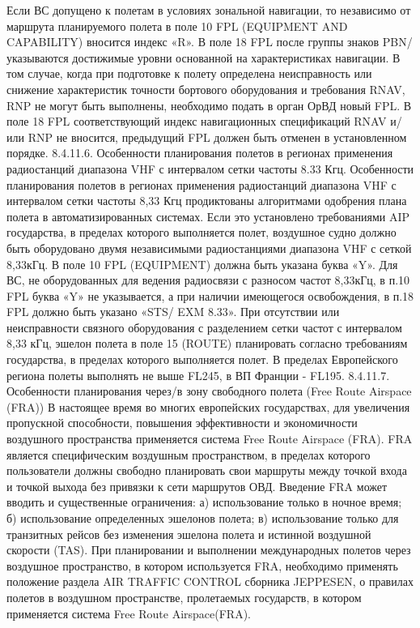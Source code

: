 Если ВС допущено к полетам в условиях зональной навигации, то независимо от маршрута планируемого полета в поле 10 FPL (EQUIPMENT AND CAPABILITY) вносится индекс «R». В поле 18 FPL после группы знаков PBN/ указываются достижимые уровни основанной на характеристиках навигации.
В том случае, когда при подготовке к полету определена неисправность или снижение характеристик точности бортового оборудования и требования RNAV, RNP не могут быть выполнены, необходимо подать в орган ОрВД новый FPL. В поле 18 FPL соответствующий индекс навигационных спецификаций RNAV и/или RNP не вносится, предыдущий FPL должен быть отменен в установленном порядке.
8.4.11.6. Особенности планирования полетов в регионах применения радиостанций диапазона VHF с интервалом сетки частоты 8.33 Кгц.
Особенности планирования полетов в регионах применения радиостанций диапазона VHF с интервалом 
сетки частоты 8,33 Кгц продиктованы алгоритмами одобрения плана полета в автоматизированных системах. 
Если это установлено требованиями AIP государства, в пределах которого выполняется полет, воздушное судно должно быть оборудовано двумя независимыми радиостанциями диапазона VHF с сеткой 8,33кГц. В поле 10 FPL (EQUIPMENT) должна быть указана буква «Y». 
Для ВС, не оборудованных для ведения радиосвязи с разносом частот 8,33кГц, в п.10 FPL буква «Y» не указывается, а при наличии имеющегося освобождения, в п.18 FPL должно быть указано «STS/ EXM 8.33». 
При отсутствии или неисправности связного оборудования с разделением сетки частот с интервалом 8,33 кГц, эшелон полета в поле 15 (ROUTE) планировать согласно требованиям государства, в пределах которого выполняется полет. В пределах Европейского региона полеты выполнять не выше FL245, в ВП Франции - FL195.
8.4.11.7. Особенности планирования через/в зону свободного полета (Free Route Airspace (FRA)) 
В настоящее время во многих европейских государствах, для увеличения пропускной способности, повышения эффективности и экономичности воздушного пространства применяется система Free Route Airspace (FRA). 
FRA является специфическим воздушным пространством, в пределах которого пользователи должны свободно планировать свои маршруты между точкой входа и точкой выхода без привязки к сети маршрутов ОВД. 
Введение FRA может вводить и существенные ограничения: 
а)	использование только в ночное время; 
б)	использование определенных эшелонов полета; 
в)	использование только для транзитных рейсов без изменения эшелона полета и истинной воздушной скорости (TAS). 
При планировании и выполнении международных полетов через воздушное пространство, в котором используется FRA, необходимо применять положение раздела AIR TRAFFIC CONTROL сборника JEPPESEN, о правилах полетов в воздушном пространстве, пролетаемых государств, в котором применяется система Free Route Airspace(FRA).
